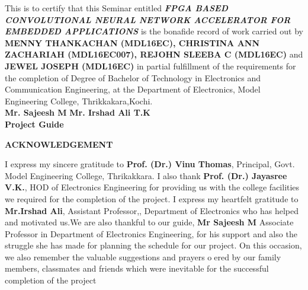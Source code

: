 \documentclass[10pt]{report}
\begin{document}
This is to certify that this Seminar  entitled \emph{\textbf{FPGA BASED CONVOLUTIONAL NEURAL NETWORK ACCELERATOR FOR EMBEDDED APPLICATIONS}} is the  bonafide record of work carried out by  \textbf{MENNY THANKACHAN (MDL16EC), CHRISTINA ANN ZACHARIAH (MDL16EC007), REJOHN SLEEBA C (MDL16EC)} and \textbf{JEWEL JOSEPH (MDL16EC)} in partial fulfillment of the requirements for the completion of Degree of Bachelor of Technology in Electronics and Communication Engineering, at the Department of Electronics, Model Engineering College, Thrikkakara,Kochi.\\ 

{\bf Mr. Sajeesh M}  \hspace*{1cm} {\bf Mr. Irshad Ali T.K }\hspace*{3cm}{\bf Dr. Jayasree V.K. }\\



{\bf{Project Guide} \hspace*{0.5 cm}{\bf Project co-ordinator }\hspace*{0.3 cm}\hspace*{0.2cm}{\bf   Head of the Department}}\\




\newpage
\linespread{1.5}
\thispagestyle{empty}
 \begin{center}\huge \bfseries  {ACKNOWLEDGEMENT} \\[1.5cm]\end{center}  
 I express my sincere gratitude to  \textbf{Prof. (Dr.) Vinu Thomas}, Principal, Govt. Model Engineering College, Thrikakkara. I also thank  \textbf{Prof. (Dr.) Jayasree V.K.}, HOD of Electronics Engineering for providing us with the
college facilities we required for the completion of the project.
I express my heartfelt gratitude to  \textbf{Mr.Irshad Ali}, Assistant Professor,, Department of Electronics who has helped and motivated us.We are also thankful to our guide, \textbf{Mr Sajeesh M} Associate Professor in Department of Electronics Engineering, for his support and also the struggle she has made for planning the schedule
for our project.
On this occasion, we also remember the valuable suggestions and prayers oered by our family members, classmates and friends which were inevitable for the successful completion of the project
 \begin{raggedright}   \hspace{350pt}  \end{raggedright}
\end{document}
